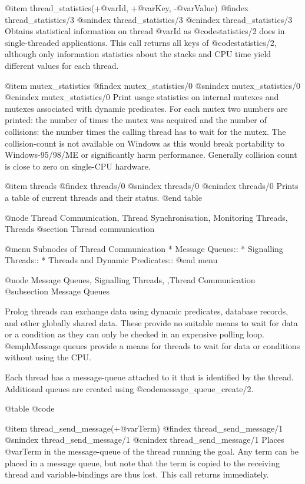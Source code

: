 {{{{{{{{@item thread_statistics(+@var{Id}, +@var{Key}, -@var{Value})
@findex thread_statistics/3
@snindex thread_statistics/3
@cnindex thread_statistics/3
Obtains statistical information on thread @var{Id} as @code{statistics/2}
does in single-threaded applications.  This call returns all keys
of @code{statistics/2}, although only information statistics about the
stacks and CPU time yield different values for each thread.

@item mutex_statistics
@findex mutex_statistics/0
@snindex mutex_statistics/0
@cnindex mutex_statistics/0
Print usage statistics on internal mutexes and mutexes associated
with dynamic predicates.  For each mutex two numbers are printed:
the number of times the mutex was acquired and the number of
collisions: the number times the calling thread has to
wait for the mutex.  The collision-count is not available on
Windows as this would break portability to Windows-95/98/ME or
significantly harm performance.  Generally collision count is
close to zero on single-CPU hardware.

@item threads
@findex threads/0
@snindex threads/0
@cnindex threads/0
Prints a table of current threads and their status.
@end table


@node Thread Communication, Thread Synchronisation, Monitoring Threads, Threads
@section Thread communication

@menu
Subnodes of Thread Communication
* Message Queues::
* Signalling Threads::            
* Threads and Dynamic Predicates::   
@end menu

@node Message Queues, Signalling Threads, ,Thread Communication
@subsection Message Queues

Prolog threads can exchange data using dynamic predicates, database
records, and other globally shared data. These provide no suitable means
to wait for data or a condition as they can only be checked in an
expensive polling loop. @emph{Message queues} provide a means for
threads to wait for data or conditions without using the CPU.

Each thread has a message-queue attached to it that is identified
by the thread. Additional queues are created using
@code{message_queue_create/2}.

@table @code

@item thread_send_message(+@var{Term})
@findex thread_send_message/1
@snindex thread_send_message/1
@cnindex thread_send_message/1
Places @var{Term} in the message-queue of the thread running the goal. 
Any term can be placed in a message queue, but note that the term is 
copied to the receiving thread and variable-bindings are thus lost. 
This call returns immediately.

}}}}}}}}
